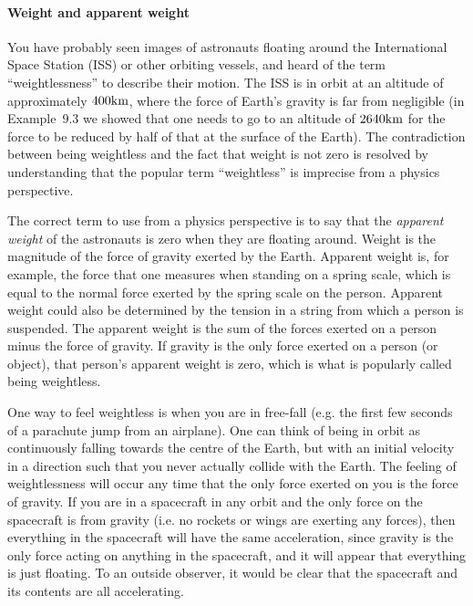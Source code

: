 \paragraph{Weight and apparent weight}

You have probably seen images of astronauts floating around the International Space Station (ISS) or other orbiting vessels, and heard of the term ``weightlessness''  to describe their motion. The ISS is in orbit at an altitude of approximately $400 {\rm km}$, where the force of Earth's gravity is far from negligible (in Example~9.3 we showed that one needs to go to an altitude of $2640 {\rm km}$ for the force to be reduced by half of that at the surface of the Earth). The contradiction between being weightless and the fact that weight is not zero is resolved by understanding that the popular term ``weightless'' is imprecise from a physics perspective.

The correct term to use from a physics perspective is to say that the \textit{apparent weight} of the astronauts is zero when they are floating around. Weight is the magnitude of the force of gravity exerted by the Earth. Apparent weight is, for example, the force that one measures when standing on a spring scale, which is equal to the normal force exerted by the spring scale on the person. Apparent weight could also be determined by the tension in a string from which a person is suspended. The apparent weight is the sum of the forces exerted on a person minus the force of gravity. If gravity is the only force exerted on a person (or object), that person's apparent weight is zero, which is what is popularly called being weightless.

One way to feel weightless is when you are in free-fall (e.g. the first few seconds of a parachute jump from an airplane). One can think of being in orbit as continuously falling towards the centre of the Earth, but with an initial velocity in a direction such that you never actually collide with the Earth. The feeling of weightlessness will occur any time that the only force exerted on you is the force of gravity. If you are in a spacecraft in any orbit and the only force on the spacecraft is from gravity (i.e. no rockets or wings are exerting any forces), then everything in the spacecraft will have the same acceleration, since gravity is the only force acting on anything in the spacecraft, and it will appear that everything is just floating. To an outside observer, it would be clear that the spacecraft and its contents are all accelerating.

